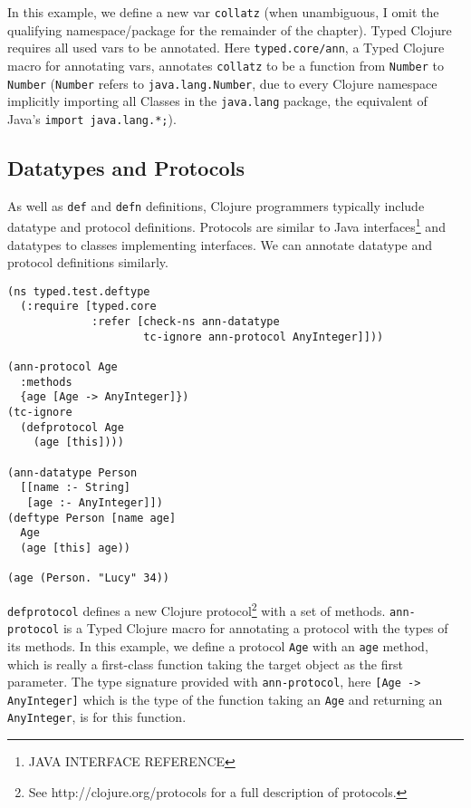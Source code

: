 In this example, we define a new var \lstinline|collatz|
(when unambiguous, I omit the qualifying namespace/package for the remainder of the chapter).
Typed Clojure requires all 
used vars to be annotated. Here \lstinline|typed.core/ann|, a Typed Clojure macro for annotating vars, 
annotates \lstinline|collatz| to be a function from \lstinline|Number| to 
\lstinline|Number| (\lstinline|Number| refers to \lstinline|java.lang.Number|,
due to every Clojure namespace implicitly importing all Classes in the \lstinline|java.lang| package,
the equivalent of Java's \lstinline|import java.lang.*;|).

\subsection{Datatypes and Protocols}

As well as \lstinline|def| and \lstinline|defn| definitions,
Clojure programmers typically include datatype and protocol
definitions. 
Protocols are similar to Java interfaces\footnote{JAVA INTERFACE REFERENCE} and datatypes to classes implementing interfaces.
We can annotate datatype and protocol definitions similarly.

\begin{lstlisting}[caption=Annotating protocols and datatypes in Typed Clojure]
(ns typed.test.deftype
  (:require [typed.core 
             :refer [check-ns ann-datatype
                     tc-ignore ann-protocol AnyInteger]]))

(ann-protocol Age 
  :methods
  {age [Age -> AnyInteger]})
(tc-ignore
  (defprotocol Age
    (age [this])))

(ann-datatype Person 
  [[name :- String]
   [age :- AnyInteger]])
(deftype Person [name age]
  Age
  (age [this] age))

(age (Person. "Lucy" 34))
\end{lstlisting}

\lstinline|defprotocol| defines a new Clojure protocol\footnote{See http://clojure.org/protocols for a full description of protocols.}
with a set of methods. \lstinline|ann-protocol| is a Typed Clojure macro for annotating 
a protocol with the types of its methods.
In this example, we define a protocol \lstinline|Age| with an \lstinline|age| method,
which is really a first-class function taking the target object as the first parameter. The
type signature provided with \lstinline|ann-protocol|, here \lstinline|[Age -> AnyInteger]|
which is the type of the function taking an \lstinline|Age| and returning an \lstinline|AnyInteger|,
is for this function.

